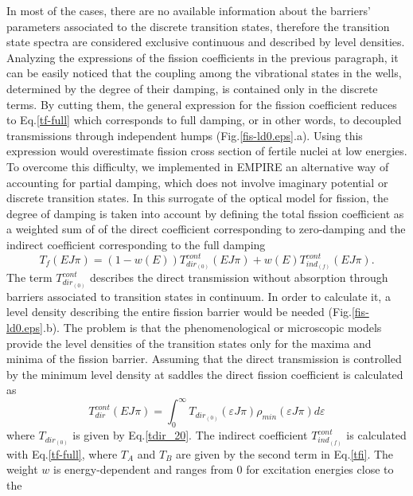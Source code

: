 In most of the cases, there are no available information about the barriers'
parameters associated to the discrete transition states, therefore the
transition state spectra are considered exclusive continuous and described
by level densities. Analyzing the expressions of the fission coefficients in
the previous paragraph, it can be easily noticed that the coupling among the
vibrational states in the wells, determined by the degree of their damping,
is contained only in the discrete terms. By cutting them, the general
expression for the fission coefficient reduces to Eq.\ref{tf-full} which
corresponds to full damping, or in other words, to decoupled transmissions
through independent humps (Fig.\ref{fis-ld0.eps}.a). Using this expression
would overestimate fission cross section of fertile nuclei at low energies.
To overcome this difficulty, we implemented in EMPIRE an alternative way of
accounting for partial damping, which does not involve imaginary potential
or discrete transition states. In this surrogate of the optical model for
fission, the degree of damping is taken into account by defining the total
fission coefficient as a weighted sum of of the direct coefficient
corresponding to zero-damping and the indirect coefficient corresponding to
the full damping
\begin{equation}
T_{f}(E J \pi)=(1-w(E))T_{dir_{(0)}}^{cont}(E J
\pi)+w(E)T_{ind_{(f)}}^{cont}(E J \pi).  \label{tfsurr}
\end{equation}
The term $T_{dir_{(0)}}^{cont}$ describes the direct transmission without
absorption through barriers associated to transition states in continuum. In
order to calculate it, a level density describing the entire fission barrier
would be needed (Fig.\ref{fis-ld0.eps}.b). The problem is that the
phenomenological or microscopic models provide the level densities of the
transition states only for the maxima and minima of the fission barrier.
Assuming that the direct transmission is controlled by the minimum level
density at saddles the direct fission coefficient is calculated as
\begin{equation}
T_{dir}^{cont}(EJ\pi)=\int_0^{\infty}T_{dir_{(0)}}(\varepsilon J
\pi)\rho_{min} (\varepsilon J \pi) d \varepsilon
\end{equation}
where $T_{dir_{(0)}}$ is given by Eq.\ref{tdir_20}. The indirect coefficient
$T_{ind_{(f)}}^{cont}$ is calculated with Eq.\ref{tf-full}, where $T_A$ and $%
T_B$ are given by the second term in Eq.\ref{tfi}. The weight $w$ is
energy-dependent and ranges from 0 for excitation energies close to the
